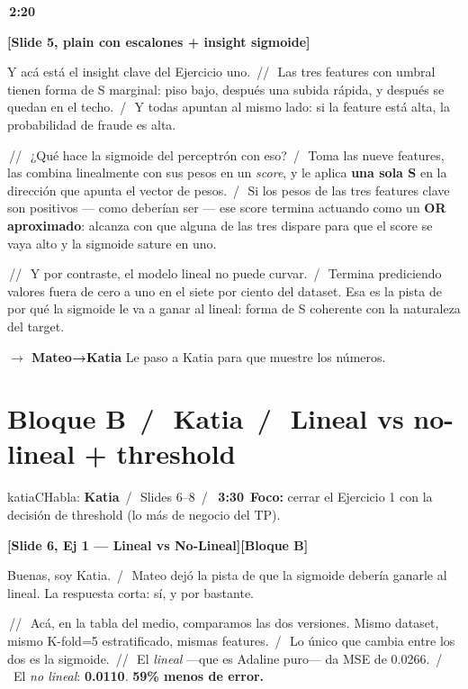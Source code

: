 \documentclass[11pt,a4paper]{article}
\newcommand{\slidenum}[1]{\textcolor{accent}{\textbf{[Slide #1]}}}
\newcommand{\timing}[1]{\textcolor{muted}{\textbf{\,#1\,}}}
\newcommand{\bloque}[1]{\textcolor{muted}{\small\textbf{[Bloque #1]}}}
\newcommand{\pausa}{\textcolor{muted}{\,/\,}}
\newcommand{\Pausa}{\textcolor{muted}{\,/\!/\,}}
\newcommand{\paso}[1]{\textcolor{accent}{\textbf{$\to$ #1}}}
\begin{document}
\timing{2:20}

\slidenum{5, plain con escalones + insight sigmoide}

Y acá está el insight clave del Ejercicio uno. \Pausa\ Las tres features con umbral tienen forma de S marginal: piso bajo, después una subida rápida, y después se quedan en el techo. \pausa\ Y todas apuntan al mismo lado: si la feature está alta, la probabilidad de fraude es alta.

\Pausa\ ¿Qué hace la sigmoide del perceptrón con eso? \pausa\ Toma las nueve features, las combina linealmente con sus pesos en un \emph{score}, y le aplica \textbf{una sola S} en la dirección que apunta el vector de pesos. \pausa\ Si los pesos de las tres features clave son positivos --- como deberían ser --- ese score termina actuando como un \textbf{OR aproximado}: alcanza con que alguna de las tres dispare para que el score se vaya alto y la sigmoide sature en uno.

\Pausa\ Y por contraste, el modelo lineal no puede curvar. \pausa\ Termina prediciendo valores fuera de cero a uno en el siete por ciento del dataset. Esa es la pista de por qué la sigmoide le va a ganar al lineal: forma de S coherente con la naturaleza del target.

\paso{Mateo→Katia} \quad Le paso a Katia para que muestre los números.

\section{Bloque B \pausa\ \textcolor{katiaC}{Katia} \pausa\ Lineal vs no-lineal + threshold}\label{sec:bloqueB}

\begin{personabox}{katiaC}{Habla: \textcolor{katiaC}{\textbf{Katia}} \pausa\ Slides 6--8 \pausa\ \timing{3:30}}
\textbf{Foco:} cerrar el Ejercicio 1 con la decisión de threshold (lo más de negocio del TP).
\end{personabox}

\slidenum{6, Ej 1 — Lineal vs No-Lineal}\quad \bloque{B}

Buenas, soy Katia. \pausa\ Mateo dejó la pista de que la sigmoide debería ganarle al lineal. La respuesta corta: sí, y por bastante.

\Pausa\ Acá, en la tabla del medio, comparamos las dos versiones. Mismo dataset, mismo K-fold=5 estratificado, mismas features. \pausa\ Lo único que cambia entre los dos es la sigmoide. \Pausa\ El \emph{lineal} ---que es Adaline puro--- da MSE de 0.0266. \pausa\ El \emph{no lineal}: \textbf{0.0110}. \textbf{59\% menos de error.}
\end{document}
